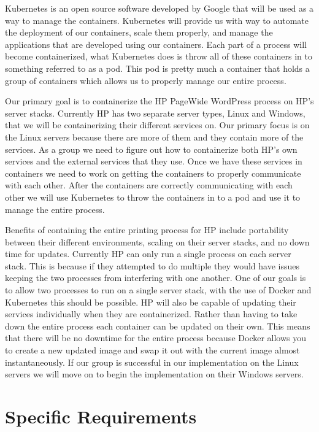 \documentclass[onecolumn, draftclsnofoot,10pt, compsoc]{IEEEtran}
\begin{document}
Kubernetes is an open source software developed by Google that will be used as a way to manage the containers. Kubernetes will provide us with way to automate the deployment of our containers, scale them properly, and manage the applications that are developed using our containers. Each part of a process will become containerized, what Kubernetes does is throw all of these containers in to something referred to as a pod. This pod is pretty much a container that holds a group of containers which allows us to properly manage our entire process\cite{docker}. 

Our primary goal is to containerize the HP PageWide WordPress process on HP’s server stacks. Currently HP has two separate server types, Linux and Windows, that we will be containerizing their different services on. Our primary focus is on the Linux servers because there are more of them and they contain more of the services. As a group we need to figure out how to containerize both HP’s own services and the external services that they use. Once we have these services in containers we need to work on getting the containers to properly communicate with each other. After the containers are correctly communicating with each other we will use Kubernetes to throw the containers in to a pod and use it to manage the entire process.

Benefits of containing the entire printing process for HP include portability between their different environments, scaling on their server stacks, and no down time for updates. Currently HP can only run a single process on each server stack. This is because if they attempted to do multiple they would have issues keeping the two processes from interfering with one another. One of our goals is to allow two processes to run on a single server stack, with the use of Docker and Kubernetes this should be possible. HP will also be capable of updating their services individually when they are containerized. Rather than having to take down the entire process each container can be updated on their own. This means that there will be no downtime for the entire process because Docker allows you to create a new updated image and swap it out with the current image almost instantaneously. If our group is successful in our implementation on the Linux servers we will move on to begin the implementation on their Windows servers.

 





\section{Specific Requirements}
\end{document}
